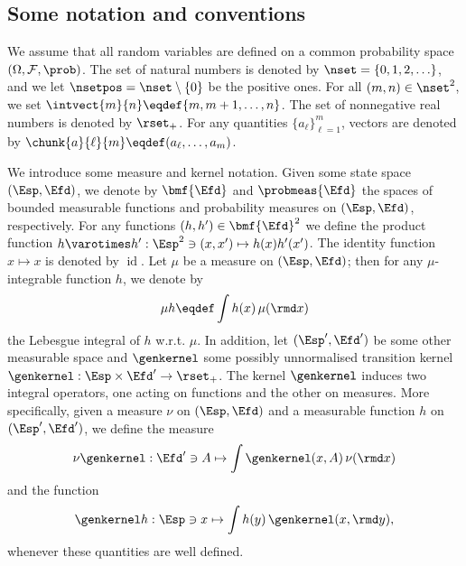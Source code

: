\subsection{Some notation and conventions}

We assume that all random variables are defined on a common probability space $(\Omega, \mathcal{F}, \prob)$. The set of natural numbers is denoted by $\nset = \{0, 1, 2, \ldots\}$, and we let $\nsetpos = \nset \setminus \{0\}$ be the positive ones. For all $(m, n) \in \nset^2$, we set $\intvect{m}{n} \eqdef \{m, m + 1, \ldots, n\}$. The set of nonnegative real numbers is denoted by $\rset_+$. For any quantities $\{ a_\ell \}_{\ell = 1}^m$, vectors are denoted by $\chunk{a}{\ell}{m} \eqdef (a_\ell, \ldots, a_m)$. 

We introduce some measure and kernel notation. Given some state space $(\Esp, \Efd)$, we denote by $\bmf{\Efd}$ and $\probmeas{\Efd}$ the spaces of bounded measurable functions and probability measures on $(\Esp, \Efd)$, respectively. For any functions $(h, h') \in \bmf{\Efd}^2$ we define the product function $h \varotimes h' : \Esp^2 \ni (x, x') \mapsto h(x) h'(x')$. The identity function $x \mapsto x$ is denoted by $\operatorname{id}$. Let $\mu$ be a measure on $(\Esp, \Efd)$; then for any $\mu$-integrable function $h$, we denote by
$$
\mu h \eqdef \int h(x) \, \mu(\rmd x)
$$
the Lebesgue integral of $h$ w.r.t. $\mu$. In addition, let $(\Esp', \Efd')$ be some other measurable space and $\genkernel$ some possibly unnormalised transition kernel $\genkernel : \Esp \times \Efd' \rightarrow \rset_+$. The kernel $\genkernel$ induces two integral operators, one acting on functions and the other on measures. More specifically, given a measure $\nu$ on $(\Esp, \Efd)$ and a measurable function $h$ on $(\Esp', \Efd')$, we define the measure 
$$
    \nu \genkernel : \Efd' \ni A \mapsto \int \genkernel(x, A) \, \nu(\rmd x) 
$$
and the function 
$$
    \genkernel h : \Esp \ni x \mapsto \int h(y) \, \genkernel(x, \rmd y),
$$
whenever these quantities are well defined. 


